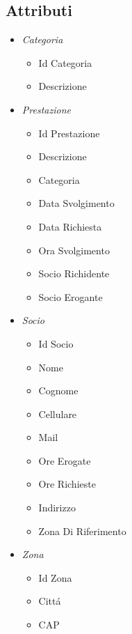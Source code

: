 ﻿\documentclass[a4paper, 12pt]{article}
\begin{document}
\subsection{Attributi}
\begin{itemize}
    \item \textit{Categoria} 
        \begin{itemize}
            \item Id Categoria
            \item Descrizione
        \end{itemize}
    \item \textit{Prestazione} 
        \begin{itemize}
            \item Id Prestazione
            \item Descrizione
            \item Categoria
            \item Data Svolgimento
            \item Data Richiesta
            \item Ora Svolgimento
            \item Socio Richidente
            \item Socio Erogante
        \end{itemize}
    \item \textit{Socio} 
        \begin{itemize}
            \item Id Socio
            \item Nome
            \item Cognome
            \item Cellulare
            \item Mail
            \item Ore Erogate
            \item Ore Richieste
            \item Indirizzo
            \item Zona Di Riferimento
        \end{itemize}
    \item \textit{Zona} 
        \begin{itemize}
            \item Id Zona
            \item Citt\'a
            \item CAP
        \end{itemize}
\end{itemize}
\end{document}
